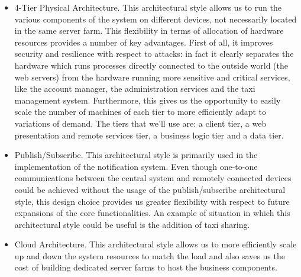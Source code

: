 \begin{itemize}
	\item 4-Tier Physical Architecture. This architectural style allows us to run the various components of the system on different devices, not necessarily located in the same server farm. This flexibility in terms of allocation of hardware resources provides a number of key advantages. First of all, it improves security and resilience with respect to attacks: in fact it clearly separates the hardware which runs processes directly connected to the outside world (the web servers) from the hardware running more sensitive and critical services, like the account manager, the administration services and the taxi management system. Furthermore, this gives us the opportunity to easily scale the number of machines of each tier to more efficiently adapt to variations of demand. The tiers that we'll use are: a client tier, a web presentation and remote services tier, a business logic tier and a data tier.
	\item Publish/Subscribe. This architectural style is primarily used in the implementation of the notification system. Even though one-to-one communications between the central system and remotely connected devices could be achieved without the usage of the publish/subscribe architectural style, this design choice provides us greater flexibility with respect to future expansions of the core functionalities. An example of situation in which this architectural style could be useful is the addition of taxi sharing.
	\item Cloud Architecture. This architectural style allows us to more efficiently scale up and down the system resources to match the load and also saves us the cost of building dedicated server farms to host the business components. 
\end{itemize}

